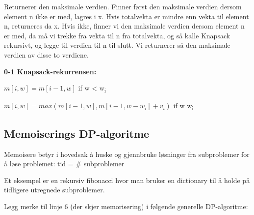 \documentclass[12pt]{report}
\begin{document}
Returnerer den maksimale verdien. Finner først den maksimale verdien dersom element n ikke er med, lagres i x. Hvis totalvekta er mindre enn vekta til element n, returneres da x. Hvis ikke, finner vi den maksimale verdien dersom element n er med, da må vi trekke fra vekta til n fra totalvekta, og så kalle Knapsack rekursivt, og legge til verdien til n til slutt. Vi returnerer så den maksimale verdien av disse to verdiene. \par

\textbf{0-1 Knapsack-rekurrensen:}\par

 \( m \left[ i,w \right] = m \left[ i-1,w \right]   \) if w < w\textsubscript{i} \par

 \( m \left[ i,w \right] =max \left( m \left[ i-1,w \right] , m \left[ i-1,w-w_{i} \right] +v_{i} \right)  \)  if w  w\textsubscript{i}\par


\vspace{\baselineskip}

\vspace{\baselineskip}

\vspace{\baselineskip}

\vspace{\baselineskip}

\vspace{\baselineskip}

\vspace{\baselineskip}

\vspace{\baselineskip}
\subsection*{Memoiserings DP-algoritme}
\setlength{\parskip}{10.56pt}
Memoisere betyr i hovedsak å huske og gjennbruke løsninger fra subproblemer for å løse problemet: tid = $\#$ subproblemer\par

Et eksempel er en rekursiv fibonacci hvor man bruker en dictionary til å holde på tidligere utregnede subproblemer.\par

Legg merke til linje 6 (der skjer memorisering) i følgende generelle DP-algoritme:\par
\end{document}
